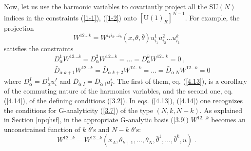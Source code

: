 \documentclass[a4paper,12pt]{article}
\begin{document}
Now, let us use the harmonic variables to covariantly project all 
the $\mbox{SU}(N)$ indices in the constraints (\ref{1-1}), 
(\ref{1-2}) onto $[\mbox{U}(1)_R]^{N-1}$. For example, the 
projection 
\begin{equation}\label{4.12}
  W^{12\ldots k} = W^{i_1i_2\ldots i_k}(x,\theta,\bar\theta) u^1_{i_1}u^2_{i_2}\ldots u^k_{i_k}
\end{equation}
satisfies the constraints 
\begin{eqnarray}
  &&D^{1}_\alpha  W^{12\ldots k} = D^{2}_\alpha  W^{12\ldots k} =\ldots =
 D^{k}_\alpha  W^{12\ldots k} = 0\;, \label{4.13}\\
  &&\bar D_{\dot\alpha\; k+1} W^{12\ldots k} = \bar D_{\dot\alpha\; k+2}
W^{12\ldots k} =\ldots = \bar D_{\dot\alpha\; N} W^{12\ldots k} = 
0 \label{4.14} 
\end{eqnarray}
where $D^I_\alpha = D^i_\alpha u_i^I$ and $\bar D_{\dot\alpha\; 
I}= \bar D_{\dot\alpha\; i}u^i_I$. The first of them, eq. 
(\ref{4.13}), is a corollary of the commuting nature of the 
harmonics variables, and the second one, eq. (\ref{4.14}), of the 
defining conditions (\ref{3.2}). In eqs. (\ref{4.13}), 
(\ref{4.14}) one recognizes the conditions for G-analyticity 
(\ref{3.7}) of the type $(N,k,N-k)$. As explained in Section 
\ref{npqhsf}, in the appropriate G-analytic basis (\ref{3.9}) 
$W^{12\ldots k}$ becomes an unconstrained function of $k$ 
$\bar\theta$'s and $N-k$ $\theta$'s: 
\begin{equation}\label{4.16}
   W^{12\ldots k} =  W^{12\ldots k}(x_A,\theta_{k+1},\ldots,\theta_{N},
\bar\theta^1,\ldots,\bar\theta^k, u)\;. 
\end{equation}
\end{document}
